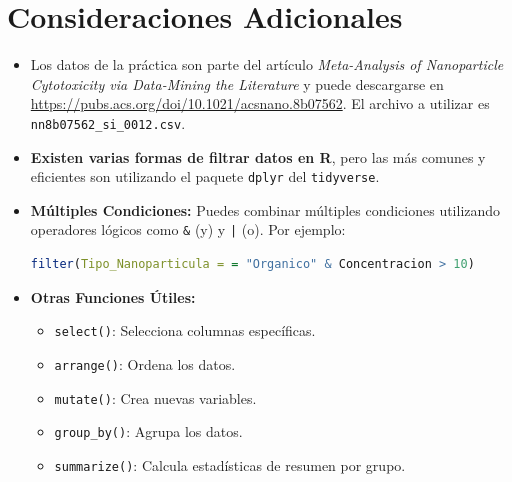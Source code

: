 \documentclass{article}
\begin{document}
\section*{Consideraciones Adicionales}
\begin{itemize}
    \item Los datos de la pr\'actica son parte del art\'iculo \textit{Meta-Analysis of Nanoparticle Cytotoxicity via Data-Mining the Literature} y puede descargarse en \url{https://pubs.acs.org/doi/10.1021/acsnano.8b07562}. El archivo a utilizar es \texttt{nn8b07562\_si\_0012.csv}.
    \item \textbf{Existen varias formas de filtrar datos en R}, pero las m\'as comunes y eficientes son utilizando el paquete \texttt{dplyr} del \texttt{tidyverse}.
    \item \textbf{Múltiples Condiciones:} Puedes combinar m\'ultiples condiciones utilizando operadores l\'ogicos como \texttt{\&} (y) y \texttt{|} (o). Por ejemplo:
    \begin{lstlisting}[language=R]
filter(Tipo_Nanoparticula = = "Organico" & Concentracion > 10)
    \end{lstlisting}
    \item \textbf{Otras Funciones \'Utiles:}
    \begin{itemize}
        \item \texttt{select()}: Selecciona columnas espec\'ificas.
        \item \texttt{arrange()}: Ordena los datos.
        \item \texttt{mutate()}: Crea nuevas variables.
        \item \texttt{group\_by()}: Agrupa los datos.
        \item \texttt{summarize()}: Calcula estad\'isticas de resumen por grupo.
    \end{itemize}
\end{itemize}
\end{document}
